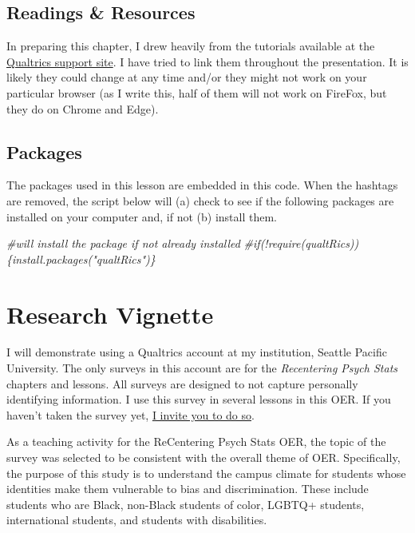 \documentclass[
  english,
]{book}
\newenvironment{Shaded}{\begin{snugshade}}{\end{snugshade}}
\newcommand{\CommentTok}[1]{\textcolor[rgb]{0.56,0.35,0.01}{\textit{#1}}}
\begin{document}
\hypertarget{readings-resources-1}{%
\subsection{Readings \& Resources}\label{readings-resources-1}}

In preparing this chapter, I drew heavily from the tutorials available at the \href{https://www.qualtrics.com/support/}{Qualtrics support site}. I have tried to link them throughout the presentation. It is likely they could change at any time and/or they might not work on your particular browser (as I write this, half of them will not work on FireFox, but they do on Chrome and Edge).

\hypertarget{packages-1}{%
\subsection{Packages}\label{packages-1}}

The packages used in this lesson are embedded in this code. When the hashtags are removed, the script below will (a) check to see if the following packages are installed on your computer and, if not (b) install them.

\begin{Shaded}
\begin{Highlighting}[]
\CommentTok{\#will install the package if not already installed}
\CommentTok{\#if(!require(qualtRics))\{install.packages("qualtRics")\}}
\end{Highlighting}
\end{Shaded}

\hypertarget{research-vignette}{%
\section{Research Vignette}\label{research-vignette}}

I will demonstrate using a Qualtrics account at my institution, Seattle Pacific University. The only surveys in this account are for the \emph{Recentering Psych Stats} chapters and lessons. All surveys are designed to not capture personally identifying information. I use this survey in several lessons in this OER. If you haven't taken the survey yet, \href{https://spupsych.az1.qualtrics.com/jfe/form/SV_b2cClqAlLGQ6nLU}{I invite you to do so}.

As a teaching activity for the ReCentering Psych Stats OER, the topic of the survey was selected to be consistent with the overall theme of OER. Specifically, the purpose of this study is to understand the campus climate for students whose identities make them vulnerable to bias and discrimination. These include students who are Black, non-Black students of color, LGBTQ+ students, international students, and students with disabilities.
\end{document}
